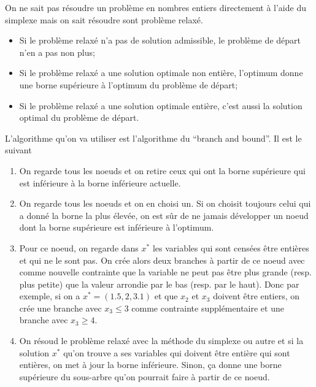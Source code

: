 On ne sait pas résoudre un problème en nombres entiers directement à l'aide
du simplexe mais on sait résoudre sont problème relaxé.
\begin{itemize}
  \item Si le problème relaxé n'a pas de solution admissible,
    le problème de départ n'en a pas non plus;
  \item Si le problème relaxé a une solution optimale non entière,
    l'optimum donne une borne supérieure à l'optimum du problème de départ;
  \item Si le problème relaxé a une solution optimale entière,
    c'est aussi la solution optimal du problème de départ.
\end{itemize}

L'algorithme qu'on va utiliser est l'algorithme du ``branch and bound''.
Il est le suivant
\begin{enumerate}
  \item On regarde tous les noeuds et on retire ceux qui ont la borne
    supérieure qui est inférieure à la borne inférieure actuelle.
  \item On regarde tous les noeuds et on en choisi un.
    Si on choisit toujours celui qui a donné la borne la plus élevée,
    on est sûr de ne jamais développer un noeud dont la borne supérieure est
    inférieure à l'optimum.
  \item Pour ce noeud, on regarde dans $x^*$ les variables qui sont censées
    être entières et qui ne le sont pas.
    On crée alors deux branches à partir de ce noeud avec comme nouvelle
    contrainte que la variable ne peut pas être plus grande
    (resp. plus petite) que la valeur arrondie par le bas (resp. par le haut).
    Donc par exemple, si on a $x^* = (1.5, 2, 3.1)$ et que $x_2$ et $x_3$
    doivent être entiers, on crée une branche avec $x_3 \leq 3$ comme
    contrainte supplémentaire et une branche avec $x_3 \geq 4$.
  \item On résoud le problème relaxé avec la méthode du simplexe ou autre
    et si la solution $x^*$ qu'on trouve a ses variables qui doivent être
    entière qui sont entières, on met à jour la borne inférieure.
    Sinon, ça donne une borne supérieure du sous-arbre qu'on pourrait
    faire à partir de ce noeud.
\end{enumerate}

